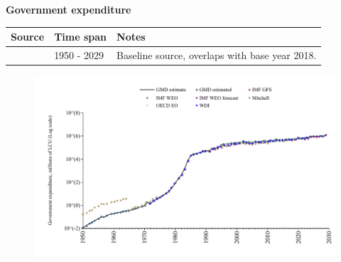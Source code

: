 \documentclass[12pt,a4paper,landscape]{article}
\begin{document}
\begin{adjustbox}{max totalsize={\paperwidth}{\paperheight},center}
\begin{minipage}[t][\textheight][t]{\textwidth}
\vspace*{0.5cm}
{}
\begin{center}
{\Large\bfseries Government expenditure}
\end{center}
\vspace{0.5cm}
\begin{table}[H]
\centering
\small
\begin{tabular}{|l|l|l|}
\hline
\textbf{Source} & \textbf{Time span} & \textbf{Notes} \\
\hline
\rowcolor{white}\cite{GMD_estimated}& 1950 - 2029 &Baseline source, overlaps with base year 2018. \\
\hline
\end{tabular}
\end{table}
\begin{figure}[H]
\centering
\includegraphics[width=\textwidth,height=0.6\textheight,keepaspectratio]{graphs/ISR_govexp.pdf}
\end{figure}
\end{minipage}
\end{adjustbox}
\end{document}
